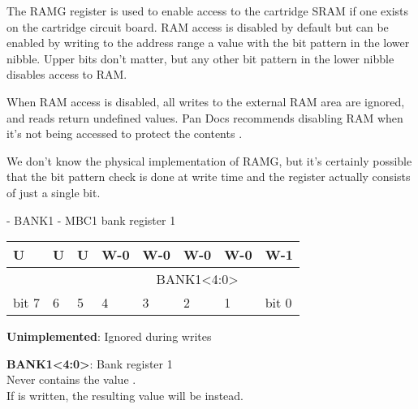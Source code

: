The RAMG register is used to enable access to the cartridge SRAM if one exists
on the cartridge circuit board. RAM access is disabled by default but can be
enabled by writing to the  address range a value with the
bit pattern  in the lower nibble. Upper bits don't matter, but any
other bit pattern in the lower nibble disables access to RAM.

When RAM access is disabled, all writes to the external RAM area
 are ignored, and reads return undefined values. Pan Docs
recommends disabling RAM when it's not being accessed to protect the contents
\cite{pandocs}.

\begin{speculation}
  We don't know the physical implementation of RAMG, but it's certainly
  possible that the  bit pattern check is done at write time and the
  register actually consists of just a single bit.
\end{speculation}

\begin{register}[H]
  \caption{ - BANK1 - MBC1 bank register 1}

  {
    \ttfamily
    \begin{tabularx}{\textwidth}{|X|X|X|X|X|X|X|X|}
      \hline
      U                     & U                     & U                     & W-0                                  & W-0 & W-0 & W-0 & W-1   \\
      \hline
      \cellcolor{LightGray} & \cellcolor{LightGray} & \cellcolor{LightGray} & \multicolumn{5}{c|}{BANK1<4:0>} \\
      \hline
      bit 7                 & 6                     & 5                     & 4                                    & 3   & 2   & 1   & bit 0 \\
      \hline
    \end{tabularx}
  }

  \begin{description}[leftmargin=5em, style=nextline]
    \item[bit 7-5]
      \textbf{Unimplemented}: Ignored during writes
    \item[bit 4-0]
      \textbf{BANK1<4:0>}: Bank register 1 \\
      Never contains the value . \\
      If  is written, the resulting value will be  instead.
  \end{description}
\end{register}

